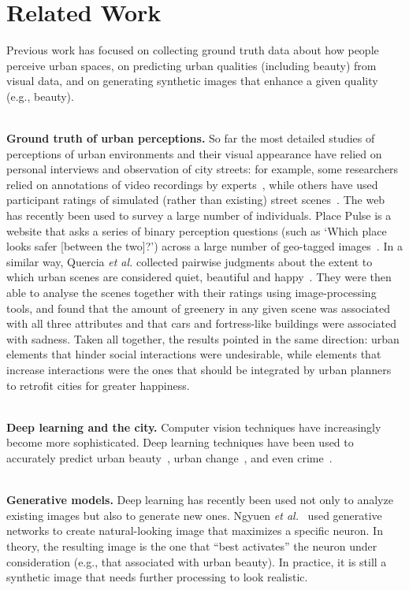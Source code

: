 \section{Related Work}
\label{sec:related}
Previous work has focused on collecting ground truth data about how people perceive urban spaces, on predicting urban qualities (including beauty) from visual data, and on generating synthetic images that enhance a given quality (e.g., beauty). 


\mbox{}\\
\noindent
\textbf{Ground truth of urban perceptions.} So far the most detailed studies of perceptions of urban environments and their visual appearance have relied on personal interviews and observation of city streets: for example, some researchers relied on annotations of video recordings by experts~\cite{sampson04seeing}, while others have used participant ratings of simulated (rather than existing) street scenes~\cite{lindal2012}. The web has recently been used to survey a large number of individuals. Place Pulse is a website that asks a series of binary perception questions (such as `Which place looks safer [between the two]?') across a large number of geo-tagged images~\cite{salesses2013collaborative}. In a similar way, Quercia \emph{et al.} collected pairwise judgments about the extent to which urban scenes are considered quiet, beautiful and happy~\cite{quercia2014aesthetic}. They were then able to analyse the scenes together with their ratings using image-processing tools, and found that the amount of greenery in any given scene was associated with all three attributes and that cars and fortress-like buildings were associated with sadness. Taken all together, the results pointed in the same direction: urban elements that hinder social interactions were undesirable, while elements that increase interactions were the ones that should be integrated by urban planners to retrofit cities for greater happiness. 

\mbox{}\\
\noindent
\textbf{Deep learning and the city.} Computer vision techniques have increasingly become more sophisticated. Deep learning techniques have been used to accurately predict urban beauty~\cite{dubey2016deep,seresinhe2017using}, urban change~\cite{naik2017computer}, and even crime~\cite{DeNadai16}.

\mbox{}\\
\noindent
\textbf{Generative models.} Deep learning has recently been used not only to analyze existing images but also to generate new ones. Ngyuen \emph{et al.}~\cite{nguyen2016synthesizing} used generative networks to create natural-looking image that maximizes a specific neuron. In theory, the resulting image is the one that ``best activates'' the neuron under consideration (e.g., that associated with urban beauty). In practice, it is still a synthetic image that needs further processing to look realistic. \mbox{} \\

